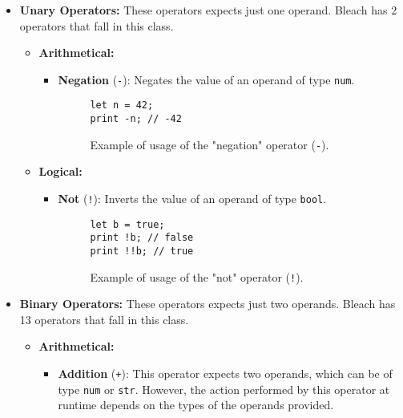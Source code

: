 \begin{itemize}
    \item \textbf{Unary Operators:} These operators expects just one operand. Bleach has 2 operators that fall in this class.
        \begin{itemize}
            \item \textbf{Arithmetical:}
                \begin{itemize}
                    \item \textbf{Negation} (\texttt{-}): Negates the value of an operand of type \texttt{num}.
                    \begin{figure}[H]
                        \centering
                        \begin{lstlisting}
let n = 42;
print -n; // -42
                        \end{lstlisting}
                        \caption{Example of usage of the "negation" operator (\texttt{-}).}
                    \end{figure}
                \end{itemize}
            \item \textbf{Logical:}
                \begin{itemize}
                    \item \textbf{Not} (\texttt{!}): Inverts the value of an operand of type \texttt{bool}.
                    \begin{figure}[H]
                        \centering
                        \begin{lstlisting}
let b = true;
print !b; // false
print !!b; // true
                        \end{lstlisting}
                        \caption{Example of usage of the "not" operator (\texttt{!}).}
                    \end{figure}                    
                \end{itemize}
        \end{itemize}
    \item \textbf{Binary Operators:} These operators expects just two operands. Bleach has 13 operators that fall in this class.
        \begin{itemize}
            \item \textbf{Arithmetical:}
                \begin{itemize}
                    \item \textbf{Addition} (\texttt{+}): This operator expects two operands, which can be of type \texttt{num} or \texttt{str}. However, the action performed by this operator at runtime depends on the types of the operands provided.


\end{itemize}
\end{itemize}
\end{itemize}
